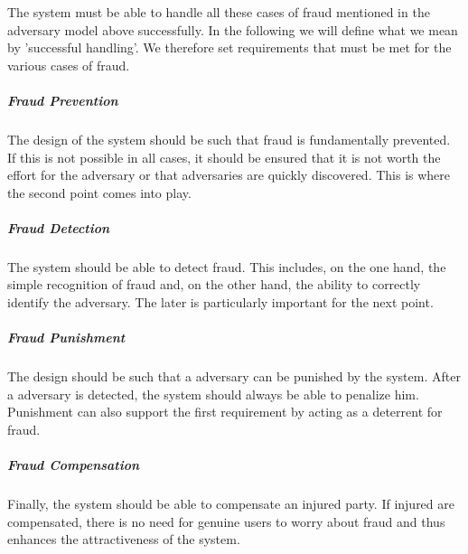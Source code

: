 The system must be able to handle all these cases of fraud mentioned in the adversary model above successfully. In the following we will define what we mean by 'successful handling'. We therefore set requirements that must be met for the various cases of fraud.
\subparagraph{Fraud Prevention} The design of the system should be such that fraud is fundamentally prevented. If this is not possible in all cases, it should be ensured that it is not worth the effort for the adversary or that adversaries are quickly discovered. This is where the second point comes into play.
\subparagraph{Fraud Detection} The system should be able to detect fraud. This includes, on the one hand, the simple recognition of fraud and, on the other hand, the ability to correctly identify the adversary. The later is particularly important for the next point.
\subparagraph{Fraud Punishment} The design should be such that a adversary can be punished by the system. After a adversary is detected, the system should always be able to penalize him. Punishment can also support the first requirement by acting as a deterrent for fraud.
\subparagraph{Fraud Compensation} Finally, the system should be able to compensate an injured party. If injured are compensated, there is no need for genuine users to worry about fraud and thus enhances the attractiveness of the system.\\